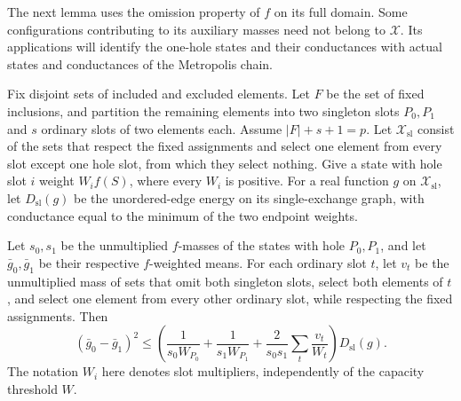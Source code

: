 The next lemma uses the omission property of $f$ on its full domain.
Some configurations contributing to its auxiliary masses need not
belong to $\mathcal X$. Its applications will identify the one-hole states and
their conductances with actual states and conductances of the
Metropolis chain.

\begin{lemma}
\label{lem:transport}
Fix disjoint sets of included and excluded elements. Let $F$ be the
set of fixed inclusions, and partition the remaining elements into two
singleton slots $P_0,P_1$ and $s$ ordinary slots of two elements each.
Assume $|F|+s+1=p$.
Let $\mathcal X_{\mathrm{sl}}$ consist of the sets that respect the
fixed assignments and select one element from every slot except one
hole slot, from which they select nothing.
Give a state with hole slot $i$ weight $W_i f(S)$, where every $W_i$ is
positive. For a real function $g$ on $\mathcal X_{\mathrm{sl}}$, let
$D_{\mathrm{sl}}(g)$ be the unordered-edge energy on its single-exchange
graph, with conductance equal to the minimum of the two endpoint weights.

Let $s_0,s_1$ be the unmultiplied $f$-masses of the states with hole
$P_0,P_1$, and let $\bar g_0,\bar g_1$ be their respective $f$-weighted
means. For each ordinary slot $t$, let $v_t$ be the unmultiplied mass
of sets that omit both singleton slots, select both elements of $t$,
and select one element from every other ordinary slot, while
respecting the fixed assignments. Then
\begin{equation}
 (\bar g_0-\bar g_1)^2
 \leq
 \left(
   \frac{1}{s_0W_{P_0}}+\frac{1}{s_1W_{P_1}}
   +\frac{2}{s_0s_1}\sum_t\frac{v_t}{W_t}
 \right)D_{\mathrm{sl}}(g).
 \label{eq:slot-transport}
\end{equation}
The notation $W_i$ here denotes slot multipliers, independently of the
capacity threshold $W$.
\end{lemma}


